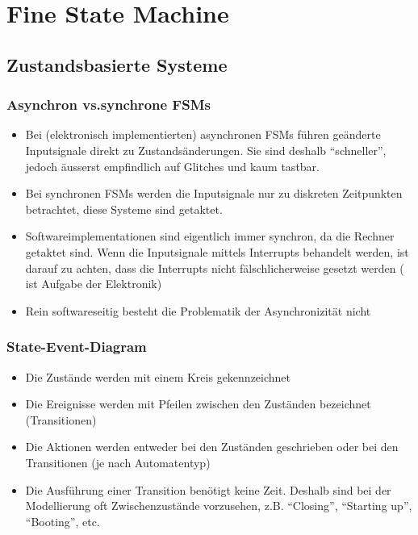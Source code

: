\section{Fine State Machine}

\subsection{Zustandsbasierte Systeme}

\subsubsection{Asynchron vs.synchrone FSMs }
\begin{itemize}
  \item Bei (elektronisch implementierten) asynchronen FSMs führen geänderte
  Inputsignale direkt zu Zustandsänderungen. Sie sind deshalb "`schneller"',
  jedoch äusserst empfindlich auf Glitches und kaum tastbar.
  \item Bei synchronen FSMs werden die Inputsignale nur zu diskreten Zeitpunkten
  betrachtet, diese Systeme sind getaktet.
  \item Softwareimplementationen sind eigentlich immer synchron, da die Rechner
  getaktet sind. Wenn die Inputsignale mittels Interrupts behandelt werden, ist
  darauf zu achten, dass die Interrupts nicht fälschlicherweise gesetzt werden (
  ist Aufgabe der Elektronik)
  \item Rein softwareseitig besteht die Problematik der Asynchronizität nicht
\end{itemize}

\subsubsection{State-Event-Diagram }
\begin{itemize}
  \item Die Zustände werden mit einem Kreis gekennzeichnet
  \item Die Ereignisse werden mit Pfeilen zwischen den Zuständen bezeichnet
  (Transitionen)
  \item Die Aktionen werden entweder bei den Zuständen geschrieben oder bei den
  Transitionen (je nach Automatentyp)
  \item Die Ausführung einer Transition benötigt keine Zeit. Deshalb sind bei
  der Modellierung oft Zwischenzustände vorzusehen, z.B. "`Closing"', "`Starting
  up"', "`Booting"', etc.
\end{itemize}

